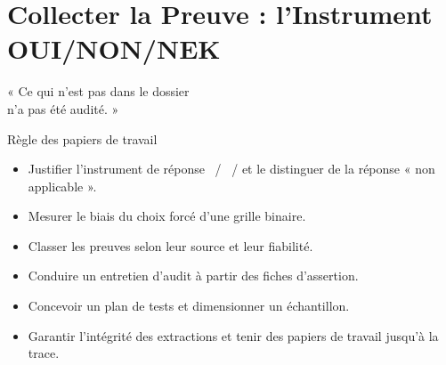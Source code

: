 
\chapter[Collecter la Preuve]{Collecter la Preuve : l'Instrument OUI/NON/NEK}
\label{chap:preuve}

\epigraph{%
    « Ce qui n'est pas dans le dossier\\
    n'a pas été audité. »%
}{Règle des papiers de travail}


\begin{boxobjectifs}
\begin{itemize}
    \item Justifier l'instrument de réponse \OUI{}~/ \NON{}~/ \NEK{} et le
          distinguer de la réponse « non applicable ».
    \item Mesurer le biais du choix forcé d'une grille binaire.
    \item Classer les preuves selon leur source et leur fiabilité.
    \item Conduire un entretien d'audit à partir des fiches d'assertion.
    \item Concevoir un plan de tests et dimensionner un échantillon.
    \item Garantir l'intégrité des extractions et tenir des papiers de
          travail jusqu'à la trace.
\end{itemize}
\end{boxobjectifs}

